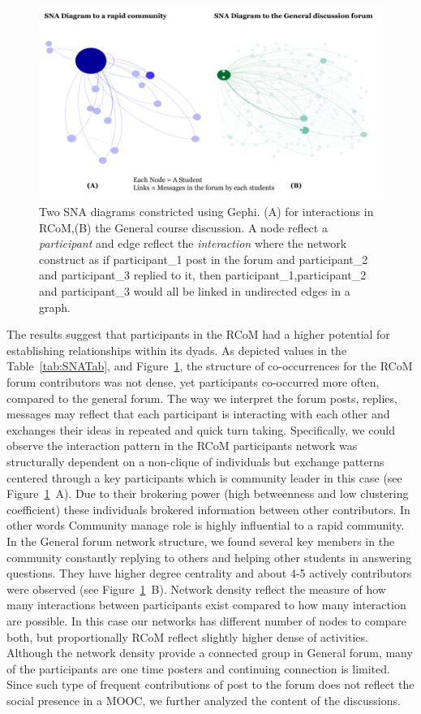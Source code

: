 \documentclass[format=acmsmall, review=false, screen=true]{acmart}
\begin{document}
\begin{figure}[h]
 \centering
 \includegraphics[width=\linewidth]{images/SNADiagrams.png}
 \caption{Two SNA diagrams constricted using Gephi. (A) for interactions in RCoM,(B) the General course discussion. A node reflect a \textit{participant} and edge reflect the \textit{interaction} where the network construct as if participant\_1 post in the forum and participant\_2 and participant\_3 replied to it, then participant\_1,participant\_2 and participant\_3 would all be linked in undirected edges in a graph.}
 \label{fig:SNA}
\end{figure}

The results suggest that participants in the RCoM had a higher potential for establishing relationships within its dyads. As depicted values in the Table~\ref{tab:SNATab}, and Figure~\ref{fig:SNA}, the structure of co-occurrences for the RCoM forum contributors was not dense, yet participants co-occurred more often, compared to the general forum. The way we interpret the forum posts, replies, messages may reflect that each participant is interacting with each other and exchanges their ideas in repeated and quick turn taking. Specifically, we could observe the interaction pattern in the RCoM participants network was structurally dependent on a non-clique of individuals but exchange patterns centered through a key participants which is community leader in this case (see Figure~\ref{fig:SNA}~A). Due to their brokering power (high betweenness and low clustering coefficient) these individuals brokered information between other contributors. In other words Community manage role is highly influential to a rapid community. In the General forum network structure, we found several key members in the community constantly replying to others and helping other students in answering questions. They have higher degree centrality and about 4-5 actively contributors were observed (see Figure~\ref{fig:SNA}~B). Network density reflect the measure of how many interactions between participants exist compared to how many interaction are possible. In this case our networks has different number of nodes to compare both, but proportionally RCoM reflect slightly higher dense of activities. Although the network density provide a connected group in General forum, many of the participants are one time posters and continuing connection is limited. Since such type of frequent contributions of post to the forum does not reflect the social presence in a MOOC, we further analyzed the content of the discussions. 
\end{document}
